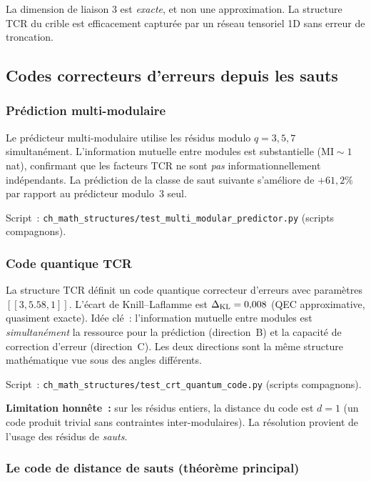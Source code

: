 \documentclass[12pt,a4paper]{article}
\begin{document}
La dimension de liaison 3 est \emph{exacte}, et non une
approximation. La structure TCR du crible est efficacement capturée
par un réseau tensoriel 1D sans erreur de troncation.


\subsection{Codes correcteurs d'erreurs depuis les sauts}
\label{sec:ms_codes}

\subsubsection{Prédiction multi-modulaire}

Le prédicteur multi-modulaire utilise les résidus modulo
$q = 3, 5, 7$ simultanément. L'information mutuelle entre modules
est substantielle ($\mathrm{MI} \sim 1$\,nat), confirmant que les
facteurs TCR ne sont \emph{pas} informationnellement indépendants. La
prédiction de la classe de saut suivante s'améliore de $+61{,}2\%$
par rapport au prédicteur modulo~3 seul.

Script~:
\texttt{ch\_math\_structures/test\_multi\_modular\_predictor.py}
(scripts compagnons).

\subsubsection{Code quantique TCR}

La structure TCR définit un code quantique correcteur d'erreurs avec
paramètres $[[3, 5.58, 1]]$. L'écart de Knill--Laflamme est
$\Delta_{\rm KL} = 0{,}008$ (QEC approximative, quasiment exacte).
Idée clé~: l'information mutuelle entre modules est
\emph{simultanément} la ressource pour la prédiction (direction~B) et
la capacité de correction d'erreur (direction~C). Les deux directions
sont la même structure mathématique vue sous des angles différents.

Script~: \texttt{ch\_math\_structures/test\_crt\_quantum\_code.py}
(scripts compagnons).

\textbf{Limitation honnête~:} sur les résidus entiers, la distance
du code est $d = 1$ (un code produit trivial sans contraintes
inter-modulaires). La résolution provient de l'usage des résidus de
\emph{sauts}.

\subsubsection{Le code de distance de sauts (théorème principal)}
\end{document}
